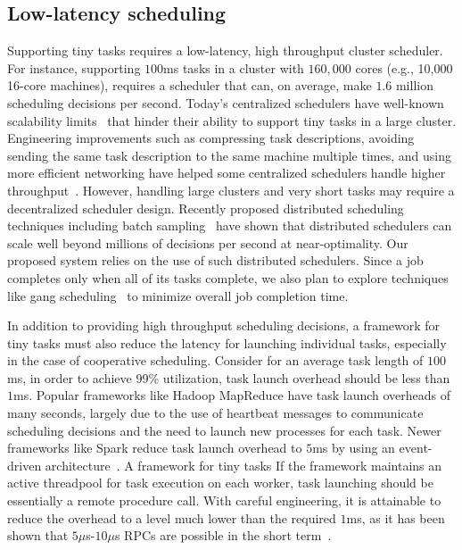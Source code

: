\subsection{Low-latency scheduling}
Supporting tiny tasks requires a low-latency, high throughput cluster scheduler.
For instance, supporting $100$ms tasks in a cluster with $160,000$ cores
(e.g., 10,000 16-core machines),
requires a scheduler that can, on average, make $1.6$ million scheduling
decisions per second.
Today's centralized schedulers have well-known scalability
limits~\cite{wilkesberkeley} that
hinder their ability to support tiny tasks in a large cluster.
Engineering improvements such as compressing task descriptions,
avoiding sending the same task description to the same machine multiple
times, and using more efficient networking have helped some
centralized schedulers
handle higher throughput~\cite{zaharia2012meetup}.
However, handling large clusters and very
short tasks may require a decentralized scheduler design.
Recently proposed distributed scheduling techniques including batch
sampling~\cite{ousterhoutbatch} have shown that distributed schedulers
can scale well beyond millions of decisions per second at near-optimality.
Our proposed system relies on the use of such distributed schedulers.
Since a job completes only when all of its tasks complete, we also plan to 
explore techniques like gang scheduling~\cite{feitelson1992gang} to minimize
overall job completion time.

In addition to providing high throughput scheduling decisions, a framework for
tiny tasks must also reduce the latency for launching individual tasks,
especially in the case of cooperative scheduling.
Consider for an average task length of $100$ms, in order to achieve 99\% utilization,
task launch overhead should be less than $1$ms.
Popular frameworks like Hadoop MapReduce
have task launch overheads of many seconds, largely due to the use of
heartbeat messages to communicate scheduling decisions and the need to launch new
processes for each task.
Newer frameworks like Spark reduce task launch overhead to $5$ms
by using an event-driven architecture~\cite{shark-tr}.
A framework for tiny tasks 
If the framework maintains an active threadpool for task execution on each worker,
task launching should be essentially a remote procedure call.
With careful engineering,
it is attainable to reduce the overhead to a level much lower than the
required $1$ms, as it has been shown that $5\mu$s-$10\mu$s RPCs are possible
in the short term~\cite{low-latency}.

